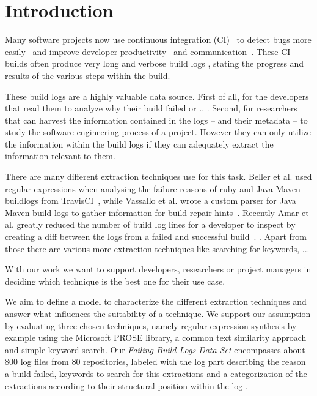 \documentclass[\myrootdir/main.tex]{subfiles}
\begin{document}
\chapter{Introduction}
Many software projects now use continuous integration (CI)~\cite{hilton2016usage,staahl2014modeling,beller2017oops} to detect bugs more easily~\cite{vasilescu2015quality,duvall2007continuous} and improve developer productivity~\cite{miller2008hundred,hilton2016usage} and communication~\cite{downs2012ambient}. These CI builds often produce very long and verbose build logs , stating the progress and results of the various steps within the build.

These build logs are a highly valuable data source. First of all, for the developers that read them to analyze why their build failed or .. . Second, for researchers that can harvest the information contained in the logs -- and their metadata -- to study the software engineering process of a project. However they can only utilize the information within the build logs if they can adequately extract the information relevant to them.

There are many different extraction techniques use for this task. Beller et al.  used regular expressions when analysing the failure reasons of ruby and Java Maven buildlogs from TravisCI~\cite{beller2017oops}, while Vassallo et al. wrote a custom parser for Java Maven build logs to gather information for build repair hints~\cite{vassallo2018un-break}. Recently Amar et al. greatly reduced the number of build log lines for a developer to inspect by creating a diff between the logs from a failed and successful build~\cite{amar2019mining}. . Apart from those there are various more extraction techniques like searching for keywords, ...  

With our work we want to support developers, researchers or project managers in deciding which technique is the best one for their use case. 


We aim to define a model to characterize the different extraction techniques and answer what influences the suitability of a technique. We support our assumption by evaluating three chosen techniques, namely regular expression synthesis by example using the Microsoft PROSE library, a common text similarity approach and simple keyword search. Our \emph{Failing Build Logs Data Set} encompasses about 800 log files from 80 repositories, labeled with the log part describing the reason a build failed, keywords to search for this extractions and a categorization of the extractions according to their structural position within the log . 
\end{document}
